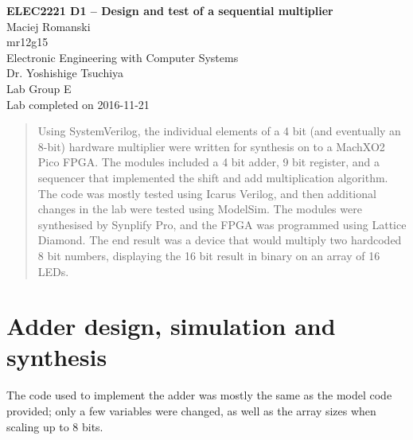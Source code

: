 \documentclass[a4paper,11pt]{article}
\begin{document}
  
\begin{center}
{\Large{\textbf{ELEC2221 D1 -- Design and test of a sequential multiplier}}} \\ [\baselineskip]
Maciej Romanski \\
mr12g15 \\
Electronic Engineering with Computer Systems \\
Dr. Yoshishige Tsuchiya \\
Lab Group E \\
Lab completed on 2016-11-21
\end{center}

\begin{abstract}
Using SystemVerilog, the individual elements of a 4 bit (and eventually an 8-bit) hardware multiplier were written for synthesis on to a MachXO2 Pico FPGA. The modules included a 4 bit adder, 9 bit register, and a sequencer that implemented the shift and add multiplication algorithm. The code was mostly tested using Icarus Verilog, and then additional changes in the lab were tested using ModelSim. The modules were synthesised by Synplify Pro, and the FPGA was programmed using Lattice Diamond. The end result was a device that would multiply two hardcoded 8 bit numbers, displaying the 16 bit result in binary on an array of 16 LEDs.
\end{abstract}

\section{Adder design, simulation and synthesis}
The code used to implement the adder was mostly the same as the model code provided; only a few variables were changed, as well as the array sizes when scaling up to 8 bits.
\end{document}
